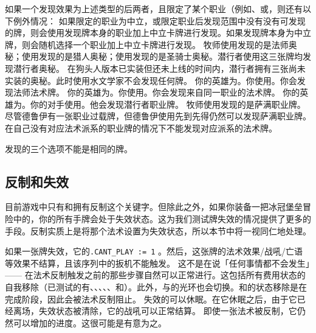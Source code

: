 如果一个发现效果为上述类型的后两者，且限定了某个职业（例如、或，则还有以下例外情况：
\notice 如果限定的职业为中立，或限定职业后发现范围中没有没有可发现的牌，则会使用发现牌本身的职业加上中立卡牌进行发现。如果发现牌本身为中立牌，则会随机选择一个职业加上中立卡牌进行发现。
\example 牧师使用发现的是法师奥秘；使用发现的是猎人奥秘；使用发现的是圣骑士奥秘。潜行者使用这三张牌均发现潜行者奥秘。
\history {} 在狗头人版本已实装但还未上线的时间内，潜行者拥有三张尚未实装的奥秘。此时使用水文学家不会发现任何牌。
\example 你的英雄为。你使用。你会发现法师法术牌。
\example 你的英雄为。你使用。你会发现来自同一职业的法术牌。
\example 你的英雄为。你的对手使用。他会发现潜行者职业牌。
\example 牧师使用发现的是萨满职业牌。
\exception 尽管德鲁伊有一张职业过载牌，但德鲁伊使用先到先得仍然可以发现萨满职业牌。
\exception {}在自己没有对应法术派系的职业牌的情况下不能发现对应派系的法术牌。

发现的三个选项不能是相同的牌。

\subsection{反制和失效}
\label{counter}

目前游戏中只有和拥有反制这个关键字。但除此之外，如果你装备一把冰冠堡垒冒险中的，你的所有手牌会处于失效状态。这为我们测试牌失效的情况提供了更多的手段。反制实质上是将那个法术设置为失效状态，所以本节中将一视同仁地处理。

如果一张牌失效，它的\texttt{.CANT\_PLAY := 1} 。然后，这张牌的法术效果/战吼/亡语等效果不结算，且该序列中的扳机不能触发。
\notice 这不是在说「任何事情都不会发生」—— 在法术反制触发之前的那些步骤自然可以正常进行。这包括所有费用状态的自我移除（已测试的有、、、、、和）。此外，与的光环也会切换。和的状态移除是在完成阶段，因此会被法术反制阻止。
\exception {}失效的可以休眠。在它休眠之后，由于它已经离场，失效状态被清除，它的战吼可以正常结算。
\exception {} 即使一张法术被反制，它仍然可以增加的进度。这很可能是有意为之。

